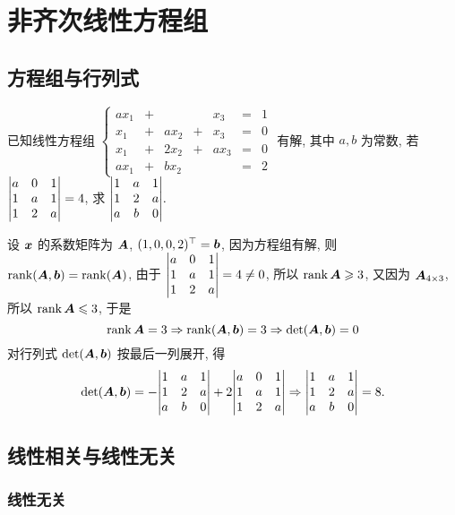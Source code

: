 \section{非齐次线性方程组}

\subsection{方程组与行列式}

\begin{example}
    已知线性方程组 $\left\{\begin{matrix}
        ax_1&+&&&x_3&=&1\\
        x_1&+&ax_2&+&x_3&=&0\\
        x_1&+&2x_2&+&ax_3&=&0\\
        ax_1&+&bx_2&&&=&2
        \end{matrix}\right.$ 有解, 其中 $a,b$ 为常数, 若 $\mqty|a&0&1\\1&a&1\\1&2&a|=4$, 求 $\mqty|1&a&1\\1&2&a\\a&b&0|.$
\end{example}
\begin{solution}
    设 $\vb*{x}$ 的系数矩阵为 $\vb*{A}$, $(1,0,0,2)^\top=\vb*{b}$, 因为方程组有解, 则 $\rank(\vb*{A},\vb*{b})=\rank(\vb*{A})$, 由于 $\mqty|a&0&1\\1&a&1\\1&2&a|=4\neq0$, 所以 $\rank\vb*{A}\geqslant 3$, 
    又因为 $\vb*{A}_{4\times3}$, 所以 $\rank\vb*{A}\leqslant 3$, 于是 $$\rank\vb*{A}=3\Rightarrow \rank(\vb*{A},\vb*{b})=3\Rightarrow\det(\vb*{A},\vb*{b})=0$$
    对行列式 $\det(\vb*{A},\vb*{b})$ 按最后一列展开, 得 
    $$\det(\vb*{A},\vb*{b})=-\mqty|1&a&1\\1&2&a\\a&b&0|+2\mqty|a&0&1\\1&a&1\\1&2&a|\Rightarrow\mqty|1&a&1\\1&2&a\\a&b&0|=8. $$
\end{solution}

\subsection{线性相关与线性无关}

\subsubsection{线性无关}

